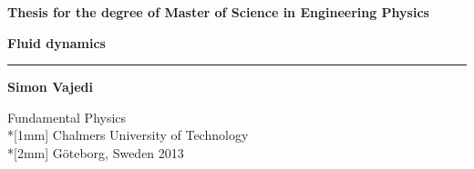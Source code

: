 \documentclass[a4paper,12pt,twoside,openright]{UGthesis}
\newcommand\ffam{\sffamily}
\newcommand\fser{\bfseries}
\newcommand\fsh{\upshape}
\newcommand\blankpage{\thispagestyle{empty}\mbox{}\newpage}
\newcommand{\titel}{Fluid dynamics}
\begin{document}
%
%

%


\setcounter{page}{1}

%
%

\thispagestyle{empty}


\begin{center}
  {\fsh\ffam\fser Thesis for the degree of Master of Science in Engineering Physics}
\end{center}


\vspace*{0.5cm}

\begin{center}
{\upshape\sffamily\bfseries\LARGE \titel}
\end{center}

\vspace*{2mm}
\begin{center}
        \rule{110mm}{2pt}
\end{center}

\vspace*{4mm}
\begin{center}
  {\fsh\ffam\fser\Large Simon Vajedi}\\
\end{center}
\vfill

\begin{center}
\end{center}

\vfill
\begin{center}
        {\ffam\fsh Fundamental Physics\\*[1mm]
        Chalmers University of Technology\\*[2mm]
        Göteborg, Sweden 2013}
\end{center}
\end{document}
